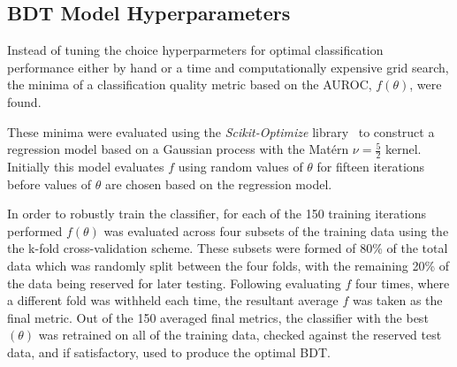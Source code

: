 \subsection{BDT Model Hyperparameters}\label{subsec:hyperparameters}
Instead of tuning the choice hyperparmeters for optimal classification performance either by hand or a time and computationally expensive grid search, the minima of a classification quality metric based on the AUROC, $f(\theta)$, were found.

These minima were evaluated using the \emph{Scikit-Optimize} library~\cite{scikit-optimise} to construct a regression model based on a Gaussian process with the Mat\'{e}rn $\nu =\frac{5}{2}$ kernel.
Initially this model evaluates $f$ using random values of $\theta$ for fifteen iterations before values of $\theta$ are chosen based on the regression model.

In order to robustly train the classifier, for each of the 150 training iterations performed $f(\theta)$ was evaluated across four subsets of the training data using the the k-fold cross-validation scheme.
These subsets were formed of 80\% of the total data which was randomly split between the four folds, with the remaining 20\% of the data being reserved for later testing.
Following evaluating $f$ four times, where a different fold was withheld each time, the resultant average $f$ was taken as the final metric.
Out of the 150 averaged final metrics, the classifier with the best $(\theta)$ was retrained on all of the training data, checked against the reserved test data, and if satisfactory, used to produce the optimal BDT.


